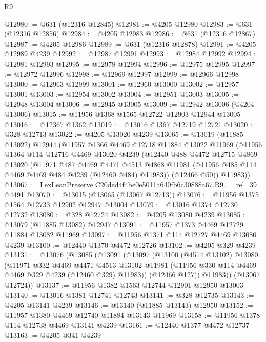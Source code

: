\begin{lexlean}{R9}
\begin{coremodule}
@12980 := @631 (@12316 @12845)
@12981 := @4205 @12980
@12983 := @631 (@12316 @12856)
@12984 := @4205 @12983
@12986 := @631 (@12316 @12867)
@12987 := @4205 @12986
@12989 := @631 (@12316 @12878)
@12991 := @4205 @12989 @4239
@12992 := @12987 @12991
@12993 := @12984 @12992
@12994 := @12981 @12993
@12995 := @12978 @12994
@12996 := @12975 @12995
@12997 := @12972 @12996
@12998 := @12969 @12997
@12999 := @12966 @12998
@13000 := @12963 @12999
@13001 := @12960 @13000
@13002 := @12957 @13001
@13003 := @12954 @13002
@13004 := @12951 @13003
@13005 := @12948 @13004
@13006 := @12945 @13005
@13009 := @12942 @13006 (@4204 @13006)
@13015 := @11956 @1368 @1565 @12722 @12903 @12944 @13005
@13016 := @12367 @1362
@13019 := @13016 @1367 @12719 @12721
@13020 := @328 @12713
@13022 := @4205 @13020 @4239
@13065 := @13019
    (@11885 @13022)
    @12944
    (@11957
      @1366
      @4469
      @12718
      @11884
      @13022
      @11969
      (@11956
        @1364
        @114
        @12716
        @4469
        @13020
        @4239
        (@12440
          @488
          @4472
          @12715
          @4869
          @13020
          (@11971
            @487
            @4469
            @4471
            @4513
            @4868
            @11981
            (@11956 @485 @114 @4469 @4469 @484 @4239 (@12460 @484) @11983))
          (@12466 @50))
        @11983))
@13067 := LexLeanPreserve.C20ded4f4be0e5011a640fb6c30888a67.R9.__rel_39 @4491
@13070 := @13015 (@13065 (@13067 @12713))
@13076 := @11956 @1375 @1564 @12733 @12902 @12947 @13004
@13079 := @13016 @1374 @12730 @12732
@13080 := @328 @12724
@13082 := @4205 @13080 @4239
@13085 := @13079 (@11885 @13082) @12947
@13091 := @11957 @1373 @4469 @12729 @11884 @13082 @11969
@13097 := @11956 @1371 @114 @12727 @4469 @13080 @4239
@13100 := @12440 @1370 @4472 @12726
@13102 := @4205 @329 @4239
@13131 := @13076
    (@13085
      (@13091
        (@13097
          (@13100
            (@4514 @13102)
            @13080
            (@11971
              @332
              @4469
              @4471
              @4513
              @13102
              @11981
              (@11956 @330 @114 @4469 @4469 @329 @4239 (@12460 @329) @11983))
            (@12466 @127))
          @11983))
      (@13067 @12724))
@13137 := @11956 @1382 @1563 @12744 @12901 @12950 @13003
@13140 := @13016 @1381 @12741 @12743
@13141 := @328 @12735
@13143 := @4205 @13141 @4239
@13146 := @13140 (@11885 @13143) @12950
@13152 := @11957 @1380 @4469 @12740 @11884 @13143 @11969
@13158 := @11956 @1378 @114 @12738 @4469 @13141 @4239
@13161 := @12440 @1377 @4472 @12737
@13163 := @4205 @341 @4239

\end{coremodule}
\end{lexlean}
